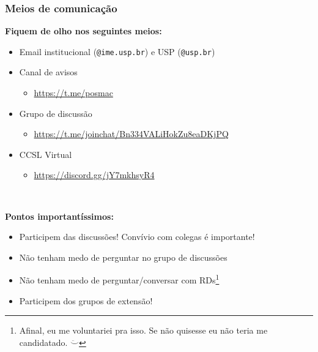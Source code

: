 \documentclass{beamer}
\begin{document}
\begin{frame}
  \frametitle{Meios de comunicação}

  \textbf{Fiquem de olho nos seguintes meios:}
  \begin{itemize}
    \item Email institucional (\texttt{@ime.usp.br}) e USP (\texttt{@usp.br})
    \item Canal de avisos
      \begin{itemize}
        \item \url{https://t.me/posmac}
      \end{itemize}
    \item Grupo de discussão
      \begin{itemize}
        \item \url{https://t.me/joinchat/Bn334VALiHokZu8eaDKjPQ}
      \end{itemize}
    \item CCSL Virtual
      \begin{itemize}
        \item \url{https://discord.gg/jY7mkhsyR4}
      \end{itemize}
  \end{itemize}~\\\pause

  \textbf{Pontos importantíssimos:}
  \begin{itemize}
    \item Participem das discussões! Convívio com colegas é importante!
    \item Não tenham medo de perguntar no grupo de discussões
    \item Não tenham medo de perguntar/conversar com RDs\footnote{Afinal, eu me voluntariei pra
      isso. Se não quisesse eu não teria me candidatado. $\ddot\smile$}
    \item Participem dos grupos de extensão!
  \end{itemize}
\end{frame}
\end{document}
